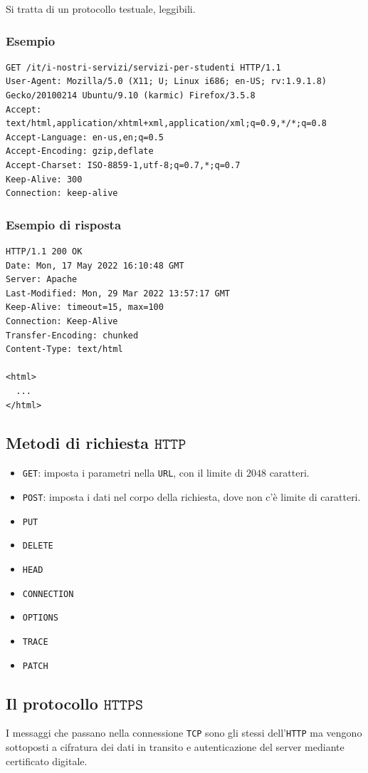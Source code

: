\documentclass[oneside,a4paper,11pt]{book}
\theoremstyle{italicstyle}
\theoremstyle{normStyle}
\begin{document}
Si tratta di un protocollo testuale, leggibili.

\subsubsection{Esempio}
\begin{lstlisting}[basicstyle=\small]
GET /it/i-nostri-servizi/servizi-per-studenti HTTP/1.1
User-Agent: Mozilla/5.0 (X11; U; Linux i686; en-US; rv:1.9.1.8)
Gecko/20100214 Ubuntu/9.10 (karmic) Firefox/3.5.8
Accept: text/html,application/xhtml+xml,application/xml;q=0.9,*/*;q=0.8
Accept-Language: en-us,en;q=0.5
Accept-Encoding: gzip,deflate
Accept-Charset: ISO-8859-1,utf-8;q=0.7,*;q=0.7
Keep-Alive: 300
Connection: keep-alive
\end{lstlisting}
\subsubsection{Esempio di risposta}
\begin{lstlisting}[basicstyle=\small]
HTTP/1.1 200 OK
Date: Mon, 17 May 2022 16:10:48 GMT
Server: Apache
Last-Modified: Mon, 29 Mar 2022 13:57:17 GMT
Keep-Alive: timeout=15, max=100
Connection: Keep-Alive
Transfer-Encoding: chunked
Content-Type: text/html

<html> 
  ... 
</html>
\end{lstlisting}
\subsection{Metodi di richiesta $\texttt{HTTP}$}
\begin{itemize}
  \item \verb|GET|: imposta i parametri nella \verb|URL|, con il limite di $2048$ caratteri.
  \item \verb|POST|: imposta i dati nel corpo della richiesta, dove non c'è limite di 
  caratteri.
  \item \verb|PUT| 
  \item \verb|DELETE| 
  \item \verb|HEAD| 
  \item \verb|CONNECTION| 
  \item \verb|OPTIONS| 
  \item \verb|TRACE| 
  \item \verb|PATCH| 
\end{itemize}
\subsection{Il protocollo $\texttt{HTTPS}$}
I messaggi che passano nella connessione \verb|TCP| sono gli stessi dell'\verb|HTTP| ma vengono 
sottoposti a cifratura dei dati in transito e autenticazione del server mediante 
certificato digitale.
\end{document}
